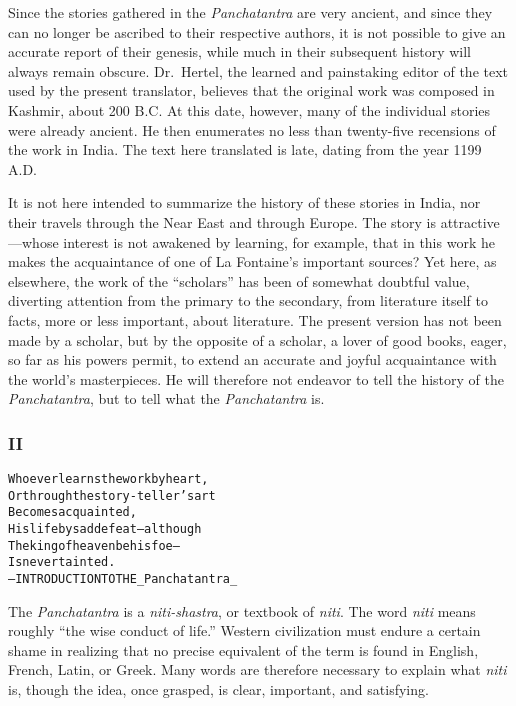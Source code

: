 \documentclass{article}
\renewenvironment{verbatim}{\begin{alltt}\normalfont\begin{centering}}{\end{centering}\end{alltt}}
\begin{document}
Since the stories gathered in the \emph{Panchatantra} are very
ancient, and since they can no longer be ascribed to their
respective authors, it is not possible to give an accurate report
of their genesis, while much in their subsequent history will
always remain obscure. Dr.~Hertel, the learned and painstaking
editor of the text used by the present translator, believes that
the original work was composed in Kashmir, about 200 B.C. At this
date, however, many of the individual stories were already ancient.
He then enumerates no less than twenty-five recensions of the work
in India. The text here translated is late, dating from the year
1199 A.D.

It is not here intended to summarize the history of these stories
in India, nor their travels through the Near East and through
Europe. The story is attractive---whose interest is not awakened by
learning, for example, that in this work he makes the acquaintance
of one of La Fontaine's important sources? Yet here, as elsewhere,
the work of the ``scholars'' has been of somewhat doubtful value,
diverting attention from the primary to the secondary, from
literature itself to facts, more or less important, about
literature. The present version has not been made by a scholar, but
by the opposite of a scholar, a lover of good books, eager, so far
as his powers permit, to extend an accurate and joyful acquaintance
with the world's masterpieces. He will therefore not endeavor to
tell the history of the \emph{Panchatantra}, but to tell what the
\emph{Panchatantra} is.

\subsubsection{II}

\begin{verbatim}
Whoever learns the work by heart,
Or through the story-teller's art
    Becomes acquainted,
His life by sad defeat--although
The king of heaven be his foe--
    Is never tainted.
        --INTRODUCTION TO THE _Panchatantra_
\end{verbatim}
The \emph{Panchatantra} is a \emph{niti-shastra}, or textbook of
\emph{niti}. The word \emph{niti} means roughly
``the wise conduct of life.'' Western civilization must endure a
certain shame in realizing that no precise equivalent of the term
is found in English, French, Latin, or Greek. Many words are
therefore necessary to explain what \emph{niti} is, though the
idea, once grasped, is clear, important, and satisfying.
\end{document}
